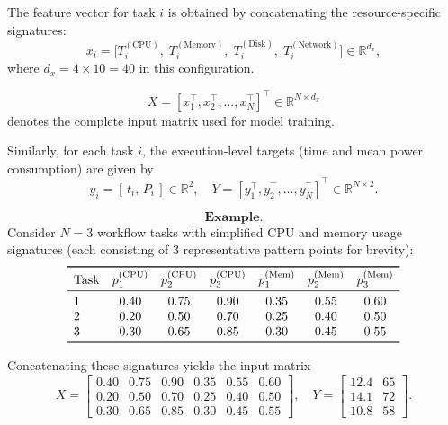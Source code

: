 \noindent
The feature vector for task \( i \) is obtained by concatenating
the resource-specific signatures:
\[
    x_i =
    \bigl[
    T_i^{(\text{CPU})},\;
    T_i^{(\text{Memory})},\;
    T_i^{(\text{Disk})},\;
    T_i^{(\text{Network})}
    \bigr]
    \in \mathbb{R}^{d_x},
\]
where \( d_x = 4 \times 10 = 40 \) in this configuration.

\[
    X =
    [x_1^\top, x_2^\top, \dots, x_N^\top]^\top
    \in \mathbb{R}^{N \times d_x}
\]
denotes the complete input matrix used for model training.

Similarly, for each task \( i \), the execution-level targets
(time and mean power consumption) are given by
\[
    y_i = [\,t_i,\, P_i\,] \in \mathbb{R}^2,
    \quad
    Y = [y_1^\top, y_2^\top, \dots, y_N^\top]^\top
    \in \mathbb{R}^{N \times 2}.
\]

\[
    \textbf{Example.}
\]
Consider \( N = 3 \) workflow tasks with simplified
CPU and memory usage signatures
(each consisting of 3 representative pattern points for brevity):
\[
    \begin{array}{lcccccc}
        \toprule
        \text{Task}        &
        p_1^{(\text{CPU})} & p_2^{(\text{CPU})} & p_3^{(\text{CPU})} &
        p_1^{(\text{Mem})} & p_2^{(\text{Mem})} & p_3^{(\text{Mem})}                             \\
        \midrule
        1                  & 0.40               & 0.75               & 0.90 & 0.35 & 0.55 & 0.60 \\
        2                  & 0.20               & 0.50               & 0.70 & 0.25 & 0.40 & 0.50 \\
        3                  & 0.30               & 0.65               & 0.85 & 0.30 & 0.45 & 0.55 \\
        \bottomrule
    \end{array}
\]

Concatenating these signatures yields the input matrix
\[
    X =
    \begin{bmatrix}
        0.40 & 0.75 & 0.90 & 0.35 & 0.55 & 0.60 \\
        0.20 & 0.50 & 0.70 & 0.25 & 0.40 & 0.50 \\
        0.30 & 0.65 & 0.85 & 0.30 & 0.45 & 0.55
    \end{bmatrix},
    \quad
    Y =
    \begin{bmatrix}
        12.4 & 65 \\
        14.1 & 72 \\
        10.8 & 58
    \end{bmatrix}.
\]

